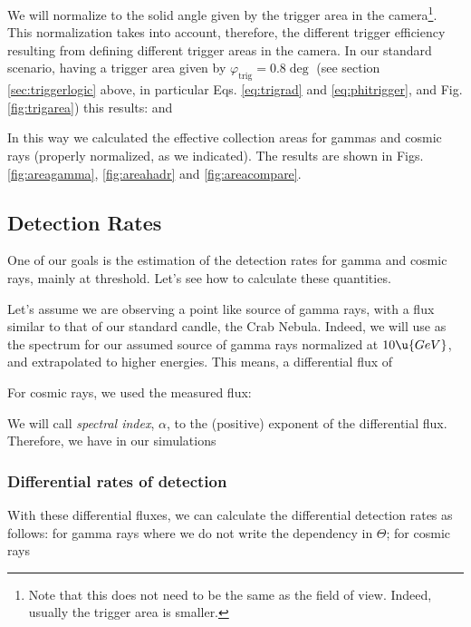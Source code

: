 We will normalize to the solid angle given by the trigger area in the
camera\footnote{ Note that this does not need to be the same as the
  field of view. Indeed, usually the trigger area is smaller.}. This
normalization takes into account, therefore, the different trigger
efficiency resulting from defining different trigger areas in the
camera. In our standard scenario, having a trigger area given by
$\varphi_{\mathrm{trig}} = 0.8\deg$ (see section
\ref{sec:triggerlogic} above, in particular Eqs.  \ref{eq:trigrad} and
\ref{eq:phitrigger}, and Fig. \ref{fig:trigarea}) this results:
%
\normsolidangleeq
%
and 
%
\Scrnormeq

In this way we calculated the effective collection areas for gammas
and cosmic rays (properly normalized, as we indicated). The results
are shown in Figs. \ref{fig:areagamma}, \ref{fig:areahadr} and
\ref{fig:areacompare}.

\MORE%

\subsection{Detection Rates}

One of our goals is the estimation of the detection rates for gamma
and cosmic rays, mainly at threshold. Let's see how to calculate these
quantities.

Let's assume we are observing a point like source of gamma rays, with
a flux similar to that of our standard candle, the Crab Nebula.
Indeed, we will use as the spectrum for our assumed source of gamma
rays
%
\gFluxeq
%
normalized at $10\u{GeV}$, and extrapolated to higher energies.
This means, a differential flux of
%
\gdFluxeq

For cosmic rays, we used the measured flux:
%
\crFluxeq

We will call \emph{spectral index}, $\alpha$, to the (positive)
exponent of the differential flux. Therefore, we have in our
simulations
%
\specindexeq

\subsubsection{Differential rates of detection}

With these differential fluxes, we can calculate the differential
detection rates as follows: for gamma rays
%
\gdRateeq
%
where we do not write the dependency in $\Theta$; for cosmic rays
%
\crdRateeq


